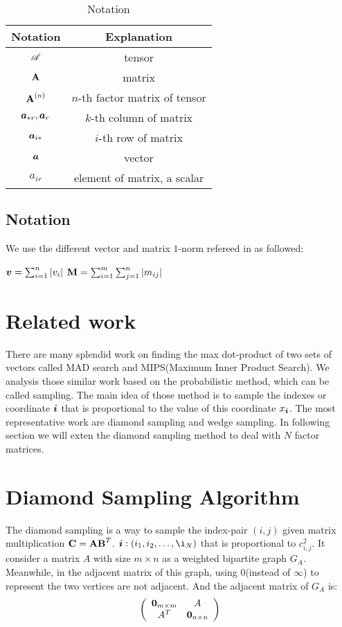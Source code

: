 \documentclass{article}
\newcommand{\T}[1]{\boldsymbol{\mathscr{\MakeUppercase{#1}}}}
\newcommand{\V}[1]{{\bm{{\MakeLowercase{#1}}}}}
\newcommand{\M}[1]{{\bm{\mathbf{\MakeUppercase{#1}}}}}
\newcommand{\Mn}[2]{\M{#1}^{(#2)}}
\begin{document}
\begin{table}[ht]
  \label{table:Notation}
  \centering
  \begin{tabular}{|c|c|}
    \hline
    Notation & Explanation \\
    \hline
    $\T{A}$ & tensor \\
    $\M{A}$ & matrix \\
    $\Mn{A}{n}$ & $n$-th factor matrix of tensor\\
    $\V{A}_{*r},\V{A}_r$ & $k$-th column of matrix \\
    $\V{A}_{i*}$ & $i$-th row of matrix \\
    $\V{A}$ & vector \\
    $a_{ir}$ & element of matrix, a scalar\\
    \hline
  \end{tabular}
  \caption{Notation}\label{table:Notation}
\end{table}

\subsection{Notation}

We use the different vector and matrix $1$-norm refereed in as followed:


  $\V{v} = \sum_{i=1}^{n}|v_i|$  $\M{M}=\sum_{i=1}^{m}\sum_{j=1}^{n}|m_{ij}|$

\section{Related work}

There are many splendid work on finding the max dot-product of two sets of vectors called MAD search and MIPS(Maximum Inner Product Search). We analysis those similar work based on the probabilistic method, which can be called sampling. The main idea of those method is to sample the indexes or coordinate $\V{i}$ that is proportional to the value of this coordinate $x_{\V{i}}$. The most representative work are diamond sampling and wedge sampling. In following section we will exten the diamond sampling method to deal with $N$ factor matrices.


\section{Diamond Sampling Algorithm}
The diamond sampling is a way to sample the index-pair $(i,j)$ given matrix multiplication $\M{C} = \M{A}\M{B}^T$. $\V{i}:(i_1,i_2,\ldots,\i_N)$  that is proportional to $c^2_{i,j}$.
It consider a matrix $A$ with size $m\times n$ as a weighted bipartite graph $G_{A}$. Meanwhile, in the adjacent matrix of this graph, using $0$(instead of $\infty$) to represent the two vertices are not adjacent. And the adjacent matrix of $G_{A}$ is:
\[
\left(
  \begin{array}{cc}
    \V{0}_{m\times m} & A \\
    A^T & \V{0}_{n\times n} \\
  \end{array}
\right)
\]
\end{document}

